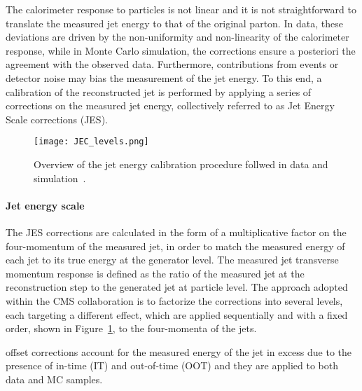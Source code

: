 The calorimeter response to particles is not linear and it is not straightforward to translate the measured jet energy
to that of the original parton.
In data, these deviations are driven by the non-uniformity and non-linearity of the calorimeter response,
while in Monte Carlo simulation, the corrections ensure a posteriori the agreement with the observed data.
Furthermore, contributions from \pileup{} events or detector noise may bias the measurement of the jet energy.
To this end, a calibration of the reconstructed jet is performed by applying a series of corrections on the measured jet energy,
collectively referred to as Jet Energy Scale corrections (JES).

\begin{figure}
\centering
\texttt{[image: JEC\_levels.png]}
\caption{Overview of the jet energy calibration procedure follwed in data and simulation~\cite{CMS-JME-13-004}.}
\label{fig:JECoverview}
\end{figure}


\paragraph{Jet energy scale\\}
The JES corrections are calculated in the form of a multiplicative factor on the four-momentum of the measured jet,
in order to match the measured energy of each jet to its true energy at the generator level.
The measured jet transverse momentum response is defined as the ratio of the measured jet \pt at the reconstruction step to the generated jet at particle level.
The approach adopted within the CMS collaboration is to factorize the corrections into several levels, each targeting a different effect,
which are applied sequentially and with a fixed order, shown in Figure~\ref{fig:JECoverview}, to the four-momenta of the jets.

\Pileup{} offset corrections account for the measured energy of the jet in excess due to
the presence of in-time (IT) and out-of-time (OOT) \pileup{}
and they are applied to both data and MC samples.

